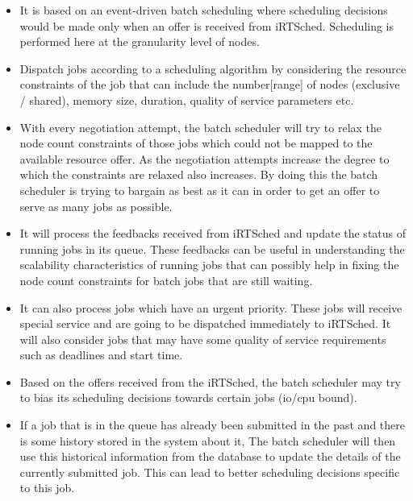 \begin{itemize}
\item It is based on an event-driven batch scheduling where scheduling decisions would be made only when an offer is received from iRTSched. Scheduling is performed here at the granularity level of nodes.
\item Dispatch jobs according to a scheduling algorithm by considering the resource constraints of the job that can include the number[range] of nodes (exclusive / shared), memory size, duration, quality of service parameters etc.
\item With every negotiation attempt, the batch scheduler will try to relax the node count constraints of those jobs which could not be mapped to the available resource offer. As the negotiation attempts increase the degree to which the constraints are relaxed also increases. By doing this the batch scheduler is trying to bargain as best as it can in order to get an offer to serve as many jobs as possible.
\item It will process the feedbacks received from iRTSched and update the status of running jobs in its queue. These feedbacks can be useful in understanding the scalability characteristics of running jobs that can possibly help in fixing the node count constraints for batch jobs that are still waiting.
\item It can also process jobs which have an urgent priority. These jobs will receive special service and are going to be dispatched immediately to iRTSched. It will also consider jobs that may have some quality of service requirements such as deadlines and start time.
\item Based on the offers received from the iRTSched, the batch scheduler may try to bias its scheduling decisions towards certain jobs (io/cpu bound).
\item If a job that is in the queue has already been submitted in the past and there is some history stored in the system about it, The batch scheduler will then use this historical information from the database to update the details of the currently submitted job. This can lead to better scheduling decisions specific to this job.
\end{itemize}
